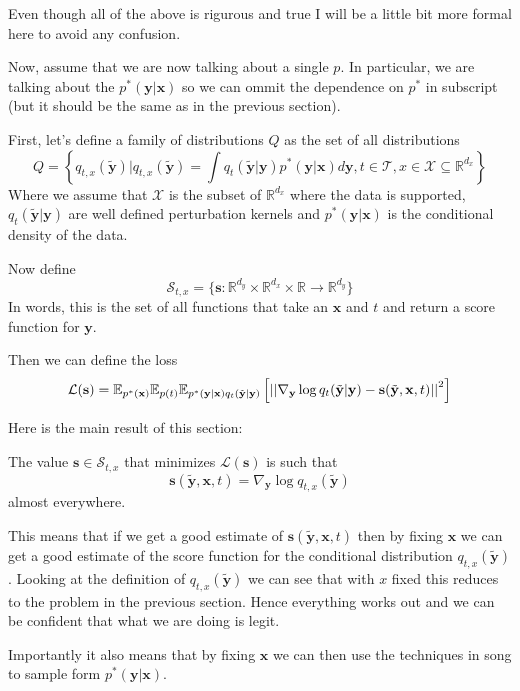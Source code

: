 Even though all of the above is rigurous and true I will be a little bit more
formal here to avoid any confusion.

Now, assume that we are now talking about a single $p$.
In particular, we are talking about the $p^*(\mathbf{y}|\mathbf{x})$
so we can ommit the dependence on $p^*$ in subscript (but it should be the
same as in the previous section).

First, let's define a family of distributions $Q$ as the set of all distributions
\[ Q = \left\{ q_{t,x} (\tilde{\mathbf{y}}) | q_{t,x}(\tilde{\mathbf{y}}) = \int q_{t}(\tilde{\mathbf{y}}| \mathbf{y}) p^*(\mathbf{y}|\mathbf{x}) d\mathbf{y}, t \in \mathcal{T}, x \in \mathcal{X} \subseteq \mathbb{R}^{d_x} \right\} \]
Where we assume that $\mathcal{X}$ is the subset of $\mathbb{R}^{d_x}$ where the data is supported,
$q_{t}(\tilde{\mathbf{y}}| \mathbf{y})$ are well defined perturbation kernels and $p^*(\mathbf{y}|\mathbf{x})$ is the
conditional density of the data.

Now define
\[ \mathcal{S}_{t,x} = \{ \mathbf{s}: \mathbb{R}^{d_y} \times \mathbb{R}^{d_x} \times \mathbb{R} \to \mathbb{R}^{d_y} \} \]
In words, this is the set of all functions that take an $\mathbf{x}$ and $t$ and return a score function for $\mathbf{y}$.

Then we can define the loss
\begin{align}
    \label{eq:score_matching_full_loss}
\mathcal{L}(\mathbf{s}) = \mathbb{E}_{p^*(\mathbf{x})} \mathbb{E}_{p(t)}\mathbb{E}_{p^*(\mathbf{y}|\mathbf{x})q_{t}(\tilde{\mathbf{y}}|\mathbf{y})} \left[ \left|\left| \nabla_{\mathbf{y}} \log q_{t}(\tilde{\mathbf{y}}|\mathbf{y}) - \mathbf{s}(\tilde{\mathbf{y}}, \mathbf{x}, t) \right|\right|^2 \right]
\end{align}


Here is the main result of this section:
\begin{theorem}
    The value $\mathbf{s} \in \mathcal{S}_{t,x}$ that minimizes $\mathcal{L}(\mathbf{s})$ is such that
    \[ \mathbf{s}(\tilde{\mathbf{y}}, \mathbf{x}, t) = \nabla_{\mathbf{y}} \log q_{t,x}(\tilde{\mathbf{y}}) \]
    almost everywhere.
\end{theorem}

\begin{remark}
    This means that if we get a good estimate of $\mathbf{s}(\tilde{\mathbf{y}}, \mathbf{x}, t)$
    then by fixing $\mathbf{x}$ we can get a good estimate of the score function for the conditional
    distribution $q_{t,x}(\tilde{\mathbf{y}})$. Looking at the definition of $q_{t,x}(\tilde{\mathbf{y}})$
    we can see that with $x$ fixed this reduces to the problem in the previous section.
    Hence everything works out and we can be confident that what we are doing is legit.

    Importantly it also means that by fixing $\mathbf{x}$ we can
    then use the techniques in song to sample form $p^*(\mathbf{y}|\mathbf{x})$.
\end{remark}


